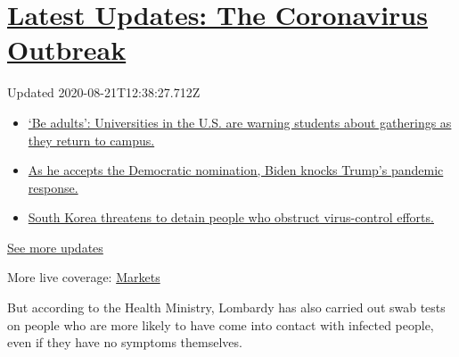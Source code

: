 \hypertarget{latest-updates-the-coronavirus-outbreak}{%
\section{\texorpdfstring{\href{https://www.nytimes3xbfgragh.onion/2020/08/21/world/covid-19-coronavirus.html?action=click\&pgtype=Article\&state=default\&region=MAIN_CONTENT_1\&context=storylines_live_updates}{Latest
Updates: The Coronavirus
Outbreak}}{Latest Updates: The Coronavirus Outbreak}}\label{latest-updates-the-coronavirus-outbreak}}

Updated 2020-08-21T12:38:27.712Z

\begin{itemize}
\tightlist
\item
  \href{https://www.nytimes3xbfgragh.onion/2020/08/21/world/covid-19-coronavirus.html?action=click\&pgtype=Article\&state=default\&region=MAIN_CONTENT_1\&context=storylines_live_updates\#link-6a60a19d}{`Be
  adults': Universities in the U.S. are warning students about
  gatherings as they return to campus.}
\item
  \href{https://www.nytimes3xbfgragh.onion/2020/08/21/world/covid-19-coronavirus.html?action=click\&pgtype=Article\&state=default\&region=MAIN_CONTENT_1\&context=storylines_live_updates\#link-324af071}{As
  he accepts the Democratic nomination, Biden knocks Trump's pandemic
  response.}
\item
  \href{https://www.nytimes3xbfgragh.onion/2020/08/21/world/covid-19-coronavirus.html?action=click\&pgtype=Article\&state=default\&region=MAIN_CONTENT_1\&context=storylines_live_updates\#link-191d44be}{South
  Korea threatens to detain people who obstruct virus-control efforts.}
\end{itemize}

\href{https://www.nytimes3xbfgragh.onion/2020/08/21/world/covid-19-coronavirus.html?action=click\&pgtype=Article\&state=default\&region=MAIN_CONTENT_1\&context=storylines_live_updates}{See
more updates}

More live coverage:
\href{https://www.nytimes3xbfgragh.onion/live/2020/08/21/business/stock-market-today-coronavirus?action=click\&pgtype=Article\&state=default\&region=MAIN_CONTENT_1\&context=storylines_live_updates}{Markets}

But according to the Health Ministry, Lombardy has also carried out swab
tests on people who are more likely to have come into contact with
infected people, even if they have no symptoms themselves.

